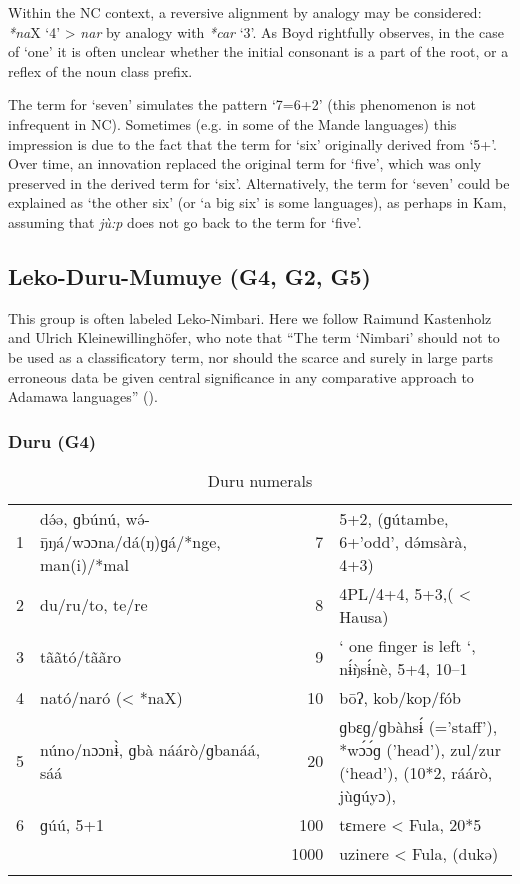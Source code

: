 Within the NC context, a reversive alignment by analogy may be considered: \textit{*na}X ‘4’ > \textit{nar} by analogy with \textit{*car} ‘3’. As Boyd rightfully observes, in the case of ‘one’ it is often unclear whether the initial consonant is a part of the root, or a reflex of the noun class prefix. 

The term for ‘seven’ simulates the pattern ‘7=6+2’ (this phenomenon is not infrequent in NC). Sometimes (e.g. in some of the Mande languages) this impression is due to the fact that the term for ‘six’ originally derived from ‘5+’. Over time, an innovation replaced the original term for ‘five’, which was only preserved in the derived term for ‘six’. Alternatively, the term for ‘seven’ could be explained as ‘the other six’ (or ‘a big six’ is some languages), as perhaps in Kam, assuming that \textit{jù:p} does not go back to the term for ‘five’.


\subsection{Leko-Duru-Mumuye (G4, G2, G5)} %
{ This group is often labeled Leko-Nimbari. Here we follow Raimund Kastenholz and Ulrich Kleinewillinghöfer, who note that ``The term ‘Nimbari’ should not to be used as a classificatory term, nor should the scarce and surely in large parts erroneous data be given central significance in any comparative approach to Adamawa languages'' (\citealt{KastenholzKleinewillinghöfer2012}).} 
\subsubsection{Duru (G4)}%
\begin{table}
\caption{\label{tab:3:105}Duru numerals}


\begin{tabularx}{\textwidth}{lQrQ}
\lsptoprule

1 & d{\'{ə}}ə, ɡbúnú, w{\'{ə}}-{\={ŋ}}ŋá/wɔɔna/dá(ŋ)ɡá/*nge, man(i)/*mal & 7 & 5+2, (ɡútambe, 6+'odd', d{\'{ə}}msàrà, 4+3)\\
2 & du/ru/to, te/re & 8 & 4PL/4+4, 5+3,( < Hausa)\\
3 & t{\~{a}}{\~{a}}tó/t{\~{a}}{\~{a}}ro & 9 & ` one finger is left `, n{\'{ɨ}}{\`{ŋ}}s{\'{ɨ}}nè, 5+4, 10--1\\
4 & nató/naró (< *naX) & 10 & bōʔ, kob/kop/fób\\
5 & núno/nɔɔn{\`{ɨ}}, ɡbà náárò/ɡbanáá, sáá & 20 & ɡbɛɡ/ɡbàhs{\'{ɨ}} (='staff'), *w{\'{ɔ}}{\'{ɔ}}ɡ ('head'), zul/zur (‘head'), (10*2, ráárò, jùɡúyɔ),\\
6 & ɡúú, 5+1 & 100 & tɛmere < Fula, 20*5\\
&  & 1000 & uzinere < Fula, (dukə)\\
\lspbottomrule
\end{tabularx}
\end{table}

